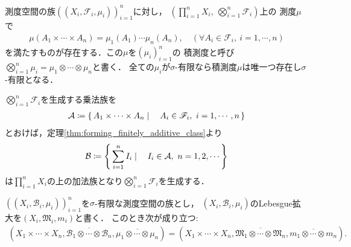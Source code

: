 		\begin{screen}
			\begin{thm}[積測度]
				測度空間の族$\left((X_i,\mathscr{F}_i,\mu_i)\right)_{i=1}^n$に対し，
				$\left( \prod_{i=1}^n X_i,\ \bigotimes_{i=1}^n \mathscr{F}_i \right)$上の
				測度$\mu$で
				\begin{align}
					\mu(A_1 \times \cdots \times A_n)
					= \mu_1(A_1) \cdots \mu_n(A_n),
					\quad (\forall A_i \in \mathscr{F}_i,\ i=1,\cdots,n)
				\end{align}
				を満たすものが存在する．この$\mu$を$(\mu_i)_{i=1}^n$の
				積測度と呼び$\bigotimes_{i=1}^n \mu_i = \mu_1 \otimes \cdots \otimes \mu_n$と書く．
				全ての$\mu_i$が$\sigma$-有限なら積測度$\mu$は唯一つ存在し$\sigma$-有限となる．
			\end{thm}
		\end{screen}
		
		\begin{prf}
			$\bigotimes_{i=1}^n \mathscr{F}_i$を生成する乗法族を
			\begin{align}
				\mathcal{A} \coloneqq
				\left\{\, A_1 \times \cdots \times A_n \mid \quad A_i \in \mathscr{F}_i,\ i=1,\cdots,n\, \right\}
			\end{align}
			とおけば，定理\ref{thm:forming_finitely_additive_class}より
			\begin{align}
				\mathcal{B} \coloneqq \left\{\, \sum_{i=1}^n I_i \mid \quad I_i \in \mathcal{A},\ n=1,2,\cdots\, \right\}
			\end{align}
			は$\prod_{i=1}^n X_i$の上の加法族となり$\bigotimes_{i=1}^n \mathscr{F}_i$を生成する．
		\end{prf}
		
		\begin{screen}
			\begin{thm}[完備測度空間の直積空間]\label{thm:product_space_of_complete_measure_space}
				$\left( (X_i,\mathcal{B}_i,\mu_i) \right)_{i=1}^n$を$\sigma$-有限な測度空間の族とし，
				$(X_i,\mathcal{B}_i,\mu_i)$のLebesgue拡大を$\left( X_i,\mathfrak{M}_i,m_i \right)$と書く．
				このとき次が成り立つ:
				\begin{align}
					\left( X_1 \times \cdots \times X_n, \overline{\mathcal{B}_1 \otimes \cdots \otimes \mathcal{B}_n}, \overline{\mu_1 \otimes \cdots \otimes \mu_n} \right)
					= \left( X_1 \times \cdots \times X_n, \overline{\mathfrak{M}_1 \otimes \cdots \otimes \mathfrak{M}_n}, \overline{m_1 \otimes \cdots \otimes m_n} \right).
				\end{align}
			\end{thm}
		\end{screen}
		
